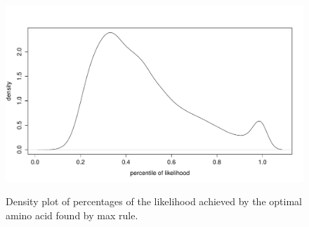 \documentclass[13pt]{article}
\begin{document}
\begin{figure}[h]
\caption{Density plot of percentages of the likelihood achieved by the optimal amino acid found by max rule.}
\centering
\includegraphics[width=\textwidth]{percentile.pdf}
\label{fig:percentile}
\end{figure}


\end{document}
